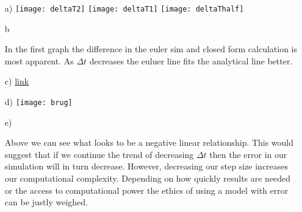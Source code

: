 \documentclass{report}
\begin{document}
\begin{itemize}
        \item[a)]{
                \texttt{[image: deltaT2]} \texttt{[image: deltaT1]} \texttt{[image: deltaThalf]}
        }
        \item[b]{
                \begin{sol}
                      In the first graph the difference in the euler sim and closed form calculation is most apparent. As $\Delta t$ decreases the euluer line fits the analytical line better. 
                \end{sol}
        }
\item[c)]{\sol \href{https://google.com}{link}}
        \item[d)]{
                \texttt{[image: brug]}\\
        }
        \item[e)]{

                \begin{sol}
                        Above we can see what looks to be a negative linear relationship. This  would suggest that if we continue the trend of decreasing $\Delta t$ then the error in our simulation will in turn decrease. However, decreasing our step size increases our computational complexity. Depending on how quickly results are needed or the access to computational power the ethics of using a model with error can be justly weighed.
                \end{sol}
        }
\end{itemize}
\end{document}
